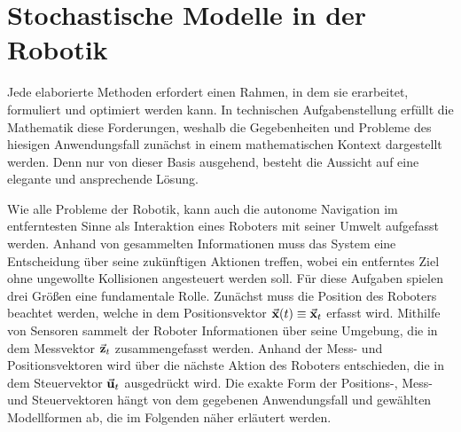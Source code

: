 \chapter{Stochastische Modelle in der Robotik}
Jede elaborierte Methoden erfordert einen Rahmen, in dem sie erarbeitet, formuliert und optimiert werden kann. In technischen Aufgabenstellung erfüllt die Mathematik diese Forderungen, weshalb die Gegebenheiten und Probleme des hiesigen Anwendungsfall zunächst in einem mathematischen Kontext dargestellt werden. Denn nur von dieser Basis ausgehend, besteht die Aussicht auf eine elegante und ansprechende Lösung.

Wie alle Probleme der Robotik, kann auch die autonome Navigation im entferntesten Sinne als Interaktion eines Roboters mit seiner Umwelt aufgefasst werden. Anhand von gesammelten Informationen muss das System eine Entscheidung über seine zukünftigen Aktionen treffen, wobei ein entferntes Ziel ohne ungewollte Kollisionen angesteuert werden soll. Für diese Aufgaben spielen drei Größen eine fundamentale Rolle. Zunächst muss die Position des Roboters beachtet werden, welche in dem Positionsvektor $\vec{\mathbf{x}}(t) \equiv \vec{\mathbf{x}}_t$ erfasst wird. Mithilfe von Sensoren sammelt der Roboter Informationen über seine Umgebung, die in dem Messvektor $\vec{\mathbf{z}}_t$ zusammengefasst werden. Anhand der Mess- und Positionsvektoren wird über die nächste Aktion des Roboters entschieden, die in dem Steuervektor $\vec{\mathbf{u}}_t$ ausgedrückt wird. Die exakte Form der Positions-, Mess- und Steuervektoren hängt von dem gegebenen Anwendungsfall und gewählten Modellformen ab, die im Folgenden näher erläutert werden.

